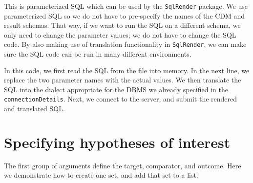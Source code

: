 \documentclass[
]{article}
\newenvironment{Shaded}{\begin{snugshade}}{\end{snugshade}}
\newcommand{\DataTypeTok}[1]{\textcolor[rgb]{0.13,0.29,0.53}{#1}}
\newcommand{\KeywordTok}[1]{\textcolor[rgb]{0.13,0.29,0.53}{\textbf{#1}}}
\newcommand{\NormalTok}[1]{#1}
\newcommand{\OperatorTok}[1]{\textcolor[rgb]{0.81,0.36,0.00}{\textbf{#1}}}
\newcommand{\StringTok}[1]{\textcolor[rgb]{0.31,0.60,0.02}{#1}}
\begin{document}
This is parameterized SQL which can be used by the \texttt{SqlRender}
package. We use parameterized SQL so we do not have to pre-specify the
names of the CDM and result schemas. That way, if we want to run the SQL
on a different schema, we only need to change the parameter values; we
do not have to change the SQL code. By also making use of translation
functionality in \texttt{SqlRender}, we can make sure the SQL code can
be run in many different environments.

\begin{Shaded}
\end{Shaded}

In this code, we first read the SQL from the file into memory. In the
next line, we replace the two parameter names with the actual values. We
then translate the SQL into the dialect appropriate for the DBMS we
already specified in the \texttt{connectionDetails}. Next, we connect to
the server, and submit the rendered and translated SQL.

\hypertarget{specifying-hypotheses-of-interest}{%
\section{Specifying hypotheses of
interest}\label{specifying-hypotheses-of-interest}}

The first group of arguments define the target, comparator, and outcome.
Here we demonstrate how to create one set, and add that set to a list:
\end{document}
